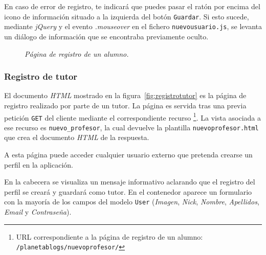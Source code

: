 \documentclass[a4paper, 12pt]{book}
\begin{document}
En caso de error de registro, te indicar\'a que puedes pasar el rat\'on por encima del icono de informaci\'on situado a la izquierda del bot\'on 
\texttt{Guardar}. Si esto sucede, mediante \textit{jQuery} y el evento \textit{.mouseover} en el fichero \texttt{nuevousuario.js}, se levanta un di\'alogo 
de informaci\'on que se encontraba previamente oculto.
\begin{figure}
  \centering
  \caption{\textit{P\'agina de registro de un alumno.}}
  \label{fig:registroalumno}
\end{figure}


\subsubsection{Registro de tutor} 
\label{sec:registrotutor}
El documento \textit{HTML} mostrado en la figura~\ref{fig:registrotutor} es la p\'agina de registro realizado por parte de un tutor. La p\'agina es servida 
tras una previa petici\'on \texttt{GET} del cliente mediante el correspondiente recurso \footnote{URL correspondiente a la p\'agina de registro de un alumno: 
\texttt{/planetablogs/nuevoprofesor/}}. La vista asociada a ese recurso es \texttt{nuevo\_profesor}, la cual devuelve la plantilla 
\texttt{nuevoprofesor.html} que crea el documento \textit{HTML} de la respuesta.

A esta p\'agina puede acceder cualquier usuario externo que pretenda crearse un perfil en la aplicaci\'on.

En la cabecera se visualiza un mensaje informativo aclarando que el registro del perfil se crear\'a y guardar\'a como tutor. En el contenedor aparece un
formulario con la mayor\'ia de los campos del modelo \texttt{User} (\textit{Imagen}, \textit{Nick}, \textit{Nombre}, \textit{Apellidos}, \textit{Email} y 
\textit{Contrase\~na}).
\end{document}
